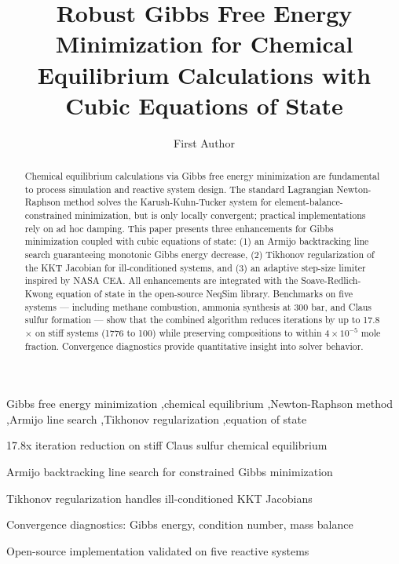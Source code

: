 \documentclass[review,3p]{elsarticle}
\begin{document}
\linenumbers
\doublespacing

\begin{frontmatter}

\title{Robust Gibbs Free Energy Minimization for Chemical Equilibrium Calculations with Cubic Equations of State}

\author[inst1]{First Author}


\begin{abstract}
Chemical equilibrium calculations via Gibbs free energy minimization are fundamental to process simulation and reactive system design. The standard Lagrangian Newton-Raphson method solves the Karush-Kuhn-Tucker system for element-balance-constrained minimization, but is only locally convergent; practical implementations rely on ad hoc damping. This paper presents three enhancements for Gibbs minimization coupled with cubic equations of state: (1) an Armijo backtracking line search guaranteeing monotonic Gibbs energy decrease, (2) Tikhonov regularization of the KKT Jacobian for ill-conditioned systems, and (3) an adaptive step-size limiter inspired by NASA CEA. All enhancements are integrated with the Soave-Redlich-Kwong equation of state in the open-source NeqSim library. Benchmarks on five systems — including methane combustion, ammonia synthesis at 300 bar, and Claus sulfur formation — show that the combined algorithm reduces iterations by up to 17.8$\times$ on stiff systems (1776 to 100) while preserving compositions to within $4 \times 10^{-5}$ mole fraction. Convergence diagnostics provide quantitative insight into solver behavior.
\end{abstract}

\begin{keyword}
Gibbs free energy minimization \sep chemical equilibrium \sep Newton-Raphson method \sep Armijo line search \sep Tikhonov regularization \sep equation of state
\end{keyword}

\begin{highlights}
\item 17.8x iteration reduction on stiff Claus sulfur chemical equilibrium
\item Armijo backtracking line search for constrained Gibbs minimization
\item Tikhonov regularization handles ill-conditioned KKT Jacobians
\item Convergence diagnostics: Gibbs energy, condition number, mass balance
\item Open-source implementation validated on five reactive systems
\end{highlights}

\end{frontmatter}
\end{document}
